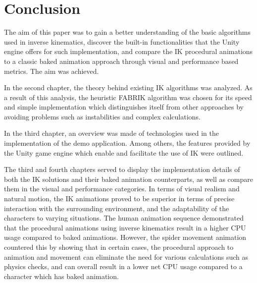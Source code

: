 \chapter{Conclusion} 
The aim of this paper was to gain a better understanding of the basic algorithms
used in inverse kinematics, discover the built-in functionalities that the Unity
engine offers for such implementation, and compare the IK procedural animations
to a classic baked animation approach through visual and performance based
metrics. The aim was achieved. 

In the second chapter, the theory behind existing IK
algorithms was analyzed. As a result of this analysis, the heuristic FABRIK
algorithm was chosen for its speed and simple implementation which distinguishes
itself from other approaches by avoiding problems such as instabilities and
complex calculations.

In the third chapter, an overview was made of technologies used in the
implementation of the demo application. Among others, the features provided by
the Unity game engine which enable and facilitate the use of IK were outlined.

The third and fourth chapters served to display the implementation details of
both the IK solutions and their baked animation counterparts, as well as compare
them in the visual and performance categories. In terms of visual realism and
natural motion, the IK animations proved to be superior in terms of precise
interaction with the surrounding environment, and the adaptability of the
characters to varying situations. The human animation sequence demonstrated that
the procedural animations using inverse kinematics result in a higher CPU usage
compared to baked animations. However, the spider movement animation countered
this by showing that in certain cases, the procedural approach to animation and
movement can eliminate the need for various calculations such as physics checks,
and can overall result in a lower net CPU usage compared to a character which
has baked animation.
